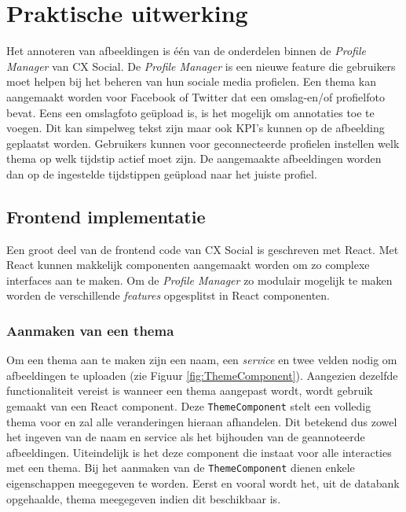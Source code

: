
\chapter{\textbf{Praktische uitwerking}}
\vspace{-3cm}
Het annoteren van afbeeldingen is \'{e}\'{e}n van de onderdelen binnen de \textit{Profile Manager} van CX Social. De \textit{Profile Manager} is een nieuwe feature die gebruikers moet helpen bij het beheren van hun sociale media profielen. Een thema kan aangemaakt worden voor Facebook of Twitter dat een omslag-en/of profielfoto bevat. Eens een omslagfoto ge\"{u}pload is, is het mogelijk om annotaties toe te voegen. Dit kan simpelweg tekst zijn maar ook KPI's kunnen op de afbeelding geplaatst worden. Gebruikers kunnen voor geconnecteerde profielen instellen welk thema op welk tijdstip actief moet zijn. De aangemaakte afbeeldingen worden dan op de ingestelde tijdstippen ge\"{u}pload naar het juiste profiel. 


\section{Frontend implementatie}
Een groot deel van de frontend code van CX Social is geschreven met React. Met React kunnen makkelijk componenten aangemaakt worden om zo complexe interfaces aan te maken. Om de \textit{Profile Manager} zo modulair mogelijk te maken worden de verschillende \textit{features} opgesplitst in React componenten. 

\subsection{Aanmaken van een thema} \label{AanmakenVanEenThema}

Om een thema aan te maken zijn een naam, een \textit{service} %
en twee velden nodig om afbeeldingen te uploaden (zie Figuur \ref{fig:ThemeComponent}). Aangezien dezelfde functionaliteit vereist is wanneer een thema aangepast wordt, wordt gebruik gemaakt van een React component. Deze \texttt{ThemeComponent} stelt een volledig thema voor en zal alle veranderingen hieraan afhandelen. Dit betekend dus zowel het ingeven van de naam en service als het bijhouden van de geannoteerde afbeeldingen. Uiteindelijk is het deze component die instaat voor alle interacties met een thema. 
Bij het aanmaken van de \texttt{ThemeComponent} dienen enkele eigenschappen meegegeven te worden. Eerst en vooral wordt het, uit de databank opgehaalde, thema meegegeven indien dit beschikbaar is. %

